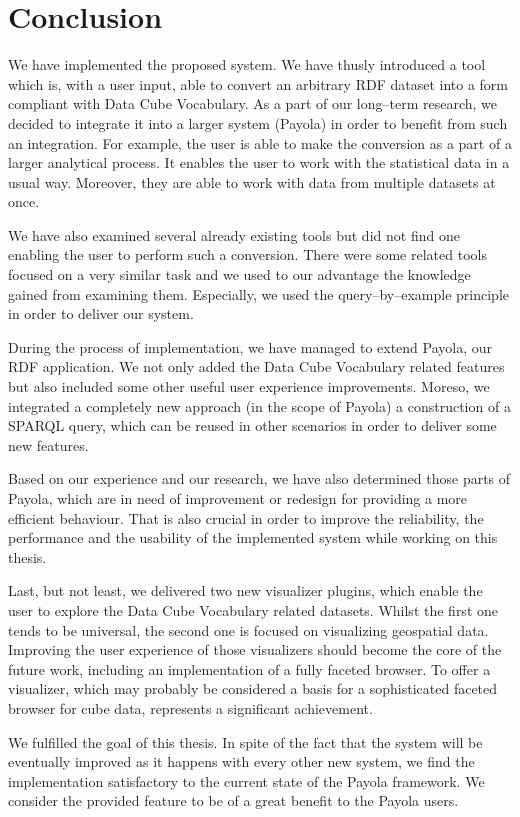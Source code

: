 \chapter*{Conclusion}

We have implemented the proposed system. We have thusly introduced a tool which is, with
a user input, able to convert an arbitrary RDF dataset into a form compliant with Data Cube Vocabulary.
As a part of our long--term research, we decided to integrate it into a larger system (Payola)
in order to benefit from such an integration.
For example, the user is able to make the conversion as a part of a larger 
analytical process. It enables the user to work with the statistical data in a 
usual way. Moreover, they are able to work with data from multiple datasets at 
once.

We have also examined several already existing tools but did not find one enabling
the user to perform such a conversion. There were some related tools 
focused on a very similar task and we used to our advantage the knowledge gained from
examining them. Especially, we used the query--by--example principle in order to 
deliver our system.

During the process of implementation, we have managed to extend Payola, our RDF application. 
We not only added the Data Cube Vocabulary related features but also included some 
other useful user experience improvements. Moreso, we integrated a completely 
new approach (in the scope of Payola) a construction of a SPARQL query, which can 
be reused in other scenarios in order to deliver some new features.

Based on our experience and our research, we have also determined those parts of 
Payola, which are in need of improvement or redesign for providing a more 
efficient behaviour. That is also crucial in order to improve the reliability, 
the performance and the usability of the implemented system while working on this 
thesis.

Last, but not least, we delivered two new visualizer plugins, which enable the 
user to explore the Data Cube Vocabulary related datasets. Whilst the first one tends to be 
universal, the second one is focused on visualizing geospatial data. Improving 
the user experience of those visualizers should become the core of the future work, 
including an implementation of a fully faceted browser. To offer a visualizer,
which may probably be considered a basis for a sophisticated faceted browser for cube data,
represents a significant achievement.

We fulfilled the goal of this thesis. In spite of the fact that the system will be eventually improved
as it happens with every other new system, we find
the implementation satisfactory to the current state of the Payola framework. We 
consider the provided feature to be of a great benefit to the Payola users.
